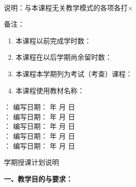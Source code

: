 \documentclass[12pt]{article}
\begin{document}
~\vspace{0.3ex}

 说明：与本课程无关教学模式的各项各打×
\vspace{0.5ex}

 备注：~~
\begin{minipage}[t]{15cm}\vspace{-1.25em}
\begin{enumerate}[1、]
	\item 本课程以前完成学时数：\underline{}
	\item 本课程在以后学期尚余留时数：\underline{}        
	\item 本课程本学期列为考试（考查）课程：\underline{} 
	\item 本课程使用教材名称： \underline{}
\end{enumerate}
\end{minipage}
\vspace{0.5ex}

\newcommand{\ud}[2]{\underline{\makebox[#1]{\textbf{#2}}} }
\setlength{\baselineskip}{1.5\baselineskip}
：\ud{10em}{}  \hspace{1em} 编写日期：\ud{5.5em}{}年\ud{3em}{}月\ud{3em}{}日\\
：\ud{10em}{}  \hspace{1em} 编写日期：\ud{5.5em}{}年\ud{3em}{}月\ud{3em}{}日\\
：\ud{10em}{}  \hspace{1em} 编写日期：\ud{5.5em}{}年\ud{3em}{}月\ud{3em}{}日\\
：\ud{10em}{}  \hspace{1em} 编写日期：\ud{5.5em}{}年\ud{3em}{}月\ud{3em}{}日\\
：\ud{10em}{}  \hspace{1em} 编写日期：\ud{5.5em}{}年\ud{3em}{}月\ud{3em}{}日\\

\pagebreak

\begin{center}
\erhao \hei 学期授课计划说明
\end{center}
\xiaosi \setlength{\parindent}{2em} \setlength{\baselineskip}{22pt}

\textbf{一、教学目的与要求：}
\end{document}
